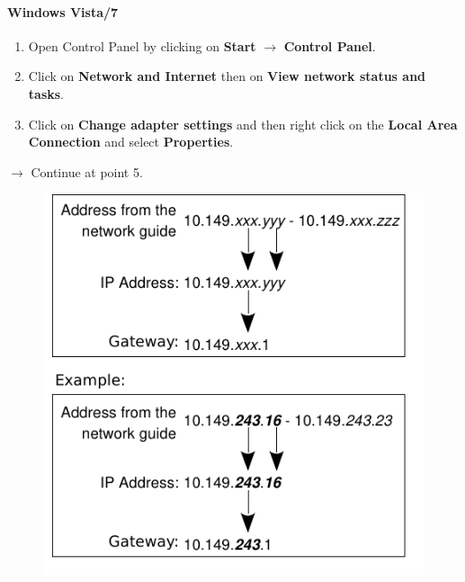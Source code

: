 \documentclass[a4paper,12pt]{scrartcl}
\newcommand{\optemph}[1]{\textbf{#1}}
\begin{document}
\paragraph*{Windows Vista/7}
\begin{enumerate}
	\item Open Control Panel by clicking on \optemph{Start} $\rightarrow$ \optemph{Control Panel}.
    \item Click on \optemph{Network and Internet} then on \optemph{View network status and tasks}.
	\item Click on \optemph{Change adapter settings} and then right click on the \optemph{Local Area Connection} and select \optemph{Properties}.
\end{enumerate}
$\rightarrow$ Continue at point 5.
      \begin{figure}[h!]
	\centering
        \vspace{-5pt}
        \begin{minipage}[c]{0.45\linewidth}
          \centering
          \includegraphics[width=\linewidth,keepaspectratio]{Bilder/IP_Gerneric_EN}
        \end{minipage}
        \begin{minipage}[c]{0.48\linewidth}
          \centering

\end{minipage}
\end{figure}
\end{document}
